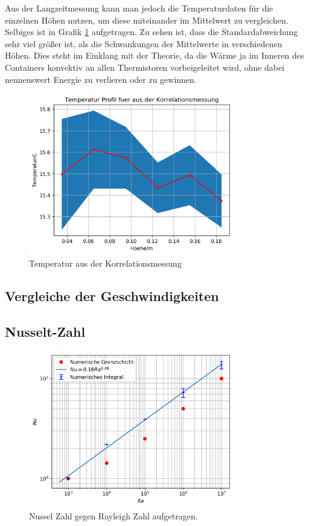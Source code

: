 \documentclass[12pt,a4paper,titlepage,headinclude]{scrartcl}
\numberwithin{equation}{subsection}
\begin{document}
Aus der Langzeitmessung kann man jedoch die Temperaturdaten f\"ur die einzelnen H\"ohen nutzen, um diese miteinander im Mittelwert zu vergleichen.
Selbiges ist in Grafik \ref{fig:T_kor} aufgetragen.
Zu sehen ist, dass die Standardabweichung sehr viel gr\"o{\ss}er ist, als die Schwankungen der Mittelwerte in verschiedenen H\"ohen.
Dies steht im Einklang mit der Theorie, da die W\"arme ja im Inneren des Containers konvektiv an allen Thermistoren vorbeigeleitet wird, ohne dabei nennenswert Energie zu verlieren oder zu gewinnen.
\begin{figure}[!ht]
\centering
\includegraphics[width=0.8\textwidth]{T_kor.png}
\caption{Temperatur aus der Korrelationsmessung}
\label{fig:T_kor}
\end{figure}





\subsection{Vergleiche der Geschwindigkeiten}

\subsection{Nusselt-Zahl}

\begin{figure}[!ht]
\centering
\includegraphics[width=0.8\textwidth]{Nu_Ra.png}
\caption{Nussel Zahl gegen Rayleigh Zahl aufgetragen.}
\label{fig:Nu_Ra}
\end{figure}
\end{document}
